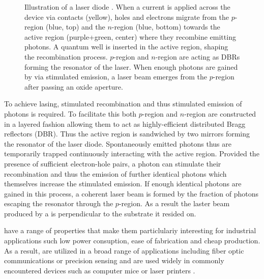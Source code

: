 		\begin{figure}[htp]
			\centering
			\caption[Sketch of a \vcsel]{Illustration of a \VCSEL laser diode \cite{ihfg2009}. When a current is applied across the device via contacts (yellow), holes and electrons migrate from the $p$-region (blue, top) and the $n$-region (blue, bottom) towards the active region (purple+green, center) where they recombine emitting photons. A quantum well is inserted in the active region, shaping the recombination process. $p$-region and $n$-region are acting as DBRs forming the resonator of the laser. When enough photons are gained by via stimulated emission, a laser beam emerges from the $p$-region after passing an oxide aperture.}
			\label{fig::vcsel_sketch}
		\end{figure}

		To achieve lasing, stimulated recombination and thus stimulated emission of photons is required. To facilitate this both $p$-region and $n$-region are constructed in a layered fashion allowing them to act as highly-efficient distributed Bragg reflectors (DBR). Thus the active region is sandwiched by two mirrors forming the resonator of the laser diode. Spontaneously emitted photons thus are temporarily trapped continuously interacting with the active region. Provided the presence of sufficient electron-hole pairs, a photon can stimulate their recombination and thus the emission of further identical photons which themselves increase the stimulated emission. If enough identical photons are gained in this process, a coherent laser beam is formed by the fraction of photons escaping the resonator through the $p$-region. As a result the laster beam produced by a \VCSEL is perpendicular to the substrate it resided on.

		\VCSELs have a range of properties that make them particlulariy interesting for industrial applications such low power consuption, ease of fabrication and cheap production. As a result, \VCSELs are utilized in a broad range of applications including fiber optic communications or precision sensing and are used widely in commonly encountered devices such as computer mice or laser printers \cite{ihfg2009}.

